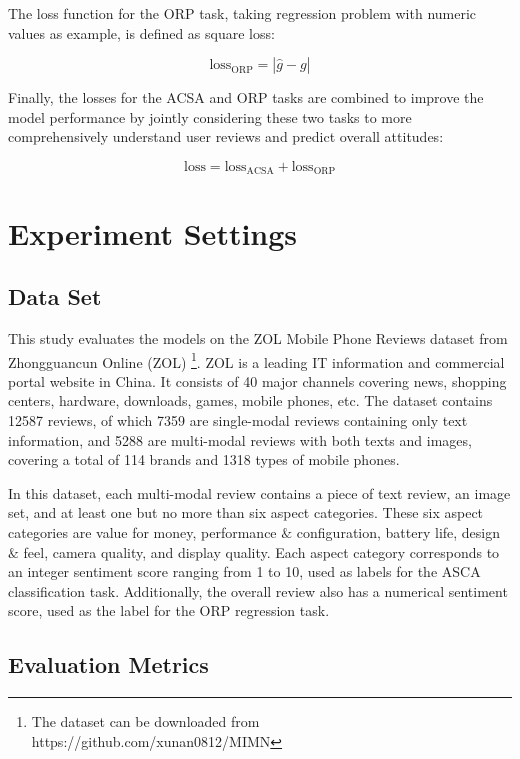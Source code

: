 \documentclass[preprint,12pt]{elsarticle}
\begin{document}
The loss function for the ORP task, taking regression problem with numeric values as example, is defined as square loss:

\begin{equation}
\text{loss}_{\text{ORP}} = |\hat{g} - g|
\end{equation}

Finally, the losses for the ACSA and ORP tasks are combined to improve the model performance by jointly considering these two tasks to more comprehensively understand user reviews and predict overall attitudes:

\begin{equation}
\text{loss} = \text{loss}_{\text{ACSA}} + \text{loss}_{\text{ORP}}
\end{equation}


\section{Experiment Settings}
\subsection{Data Set}

This study evaluates the models on the ZOL Mobile Phone Reviews dataset from Zhongguancun Online (ZOL) \citep{xu2019multi}\footnote{The dataset can be downloaded from https://github.com/xunan0812/MIMN}. ZOL is a leading IT information and commercial portal website in China. It consists of 40 major channels covering news, shopping centers, hardware, downloads, games, mobile phones, etc. The dataset contains 12587 reviews, of which 7359 are single-modal reviews containing only text information, and 5288 are multi-modal reviews with both texts and images, covering a total of 114 brands and 1318 types of mobile phones.

In this dataset, each multi-modal review contains a piece of text review, an image set, and at least one but no more than six aspect categories. These six aspect categories are value for money, performance $\&$ configuration, battery life, design $\&$ feel, camera quality, and display quality. Each aspect category corresponds to an integer sentiment score ranging from 1 to 10, used as labels for the ASCA classification task. Additionally, the overall review also has a numerical sentiment score, used as the label for the ORP regression task.


\subsection {Evaluation Metrics}
\end{document}
